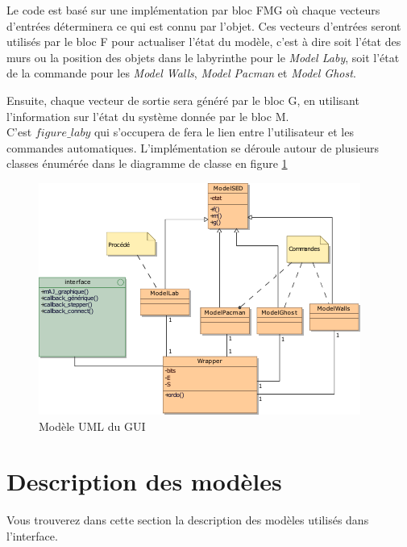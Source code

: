 Le code est basé sur une implémentation par bloc FMG où chaque vecteurs d'entrées déterminera ce qui est connu par l'objet. Ces vecteurs d'entrées seront utilisés par le bloc F pour actualiser l'état du modèle, c'est à dire soit l'état des murs ou la position des objets dans le labyrinthe pour le \emph{Model Laby}, soit l'état de la commande pour les \emph{Model Walls}, \emph{Model Pacman} et \emph{Model Ghost}. 

Ensuite, chaque vecteur de sortie sera généré par le bloc G, en utilisant l'information sur l'état du système donnée par le bloc M. \\

C'est $figure\_laby$ qui s'occupera de fera le lien entre l'utilisateur et les commandes automatiques. L'implémentation se déroule autour de plusieurs classes énumérée dans le diagramme de classe en figure \ref{fig:modelUML_GUI}
\begin{figure}[!ht]
\centering
\includegraphics[width = \textwidth]{./1_Interface_2_joueurs/interactionModeles.pdf}
\caption{Modèle UML du GUI}\label{fig:modelUML_GUI}
\end{figure}
\section{Description des modèles} 
Vous trouverez dans cette section la description des modèles utilisés dans l'interface.
